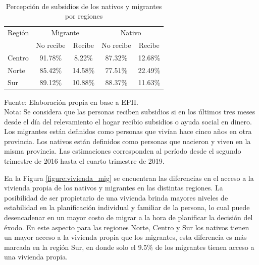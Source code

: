 \documentclass[12pt,a4paper]{article}
\begin{document}
\begin{table}[htbp!]
\caption{\\Percepción de subsidios de los nativos y migrantes por regiones} 
\label{cuadro:subsidio_mig}
\centering
\begin{tabular}{lcccc}
\hline
\multicolumn{1}{c}{Región} & \multicolumn{2}{c}{Migrante} & \multicolumn{2}{c}{Nativo} \\ \cline{2-5} 
                           & No recibe      & Recibe      & No recibe     & Recibe     \\ \hline
Centro                     & 91.78\%        & 8.22\%      & 87.32\%       & 12.68\%    \\ 
Norte                      & 85.42\%        & 14.58\%     & 77.51\%       & 22.49\%    \\ 
Sur                        & 89.12\%        & 10.88\%     & 88.37\%       & 11.63\%    \\ \hline
\end{tabular}
\begin{flushleft}
\begin{scriptsize}
Fuente: Elaboración propia en base a EPH.\\
Nota: Se considera que las personas reciben subsidios si en los últimos tres meses desde el día del relevamiento el hogar recibio subsidios o ayuda social en dinero. Los migrantes están definidos como personas que vivían hace cinco años en otra provincia. Los nativos están definidos como personas que nacieron y viven en la misma provincia. Las estimaciones corresponden al período desde el segundo trimestre de 2016 hasta el cuarto trimestre de 2019.\\
\end{scriptsize}
\end{flushleft}
\end{table}

En la Figura \ref{figure:vivienda_mig} se encuentran las diferencias en el acceso a la vivienda propia de los nativos y migrantes  en las distintas regiones. La posibilidad de ser propietario de una vivienda brinda mayores niveles de estabilidad en la planificación individual y familiar de la persona, lo cual puede desencadenar en un mayor costo de migrar a la hora de planificar la decisión del éxodo. En este aspecto para las regiones Norte, Centro y Sur los nativos tienen un mayor acceso a la vivienda propia que los migrantes, esta diferencia es más marcada en la región Sur, en donde solo el 9.5\% de los migrantes tienen acceso a una vivienda propia.
\end{document}

